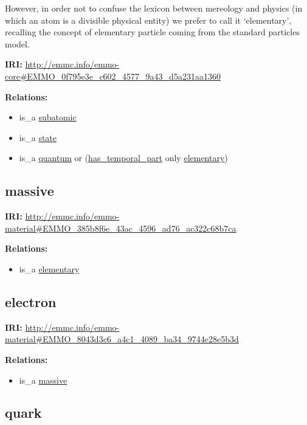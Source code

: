 \documentclass[a4paper,]{report}
\providecommand{\tightlist}{%
  \setlength{\itemsep}{0pt}\setlength{\parskip}{0pt}}
\begin{document}
However, in order not to confuse the lexicon between mereology and
physics (in which an atom is a divisible physical entity) we prefer to
call it `elementary', recalling the concept of elementary particle
coming from the standard particles model.

\textbf{IRI:}
\url{http://emmc.info/emmo-core\#EMMO_0f795e3e_c602_4577_9a43_d5a231aa1360}

\textbf{Relations:}

\begin{itemize}
\tightlist
\item
  is\_a \protect\hyperlink{subatomic}{subatomic}
\item
  is\_a \protect\hyperlink{state}{state}
\item
  is\_a \protect\hyperlink{quantum}{quantum} or
  (\protect\hyperlink{has_temporal_part}{has\_temporal\_part} only
  \protect\hyperlink{elementary}{elementary})
\end{itemize}

\hypertarget{massive}{%
\subsection{massive}\label{massive}}

\textbf{IRI:}
\url{http://emmc.info/emmo-material\#EMMO_385b8f6e_43ac_4596_ad76_ac322c68b7ca}

\textbf{Relations:}

\begin{itemize}
\tightlist
\item
  is\_a \protect\hyperlink{elementary}{elementary}
\end{itemize}

\hypertarget{electron}{%
\subsection{electron}\label{electron}}

\textbf{IRI:}
\url{http://emmc.info/emmo-material\#EMMO_8043d3c6_a4c1_4089_ba34_9744e28e5b3d}

\textbf{Relations:}

\begin{itemize}
\tightlist
\item
  is\_a \protect\hyperlink{massive}{massive}
\end{itemize}

\hypertarget{quark}{%
\subsection{quark}\label{quark}}
\end{document}
